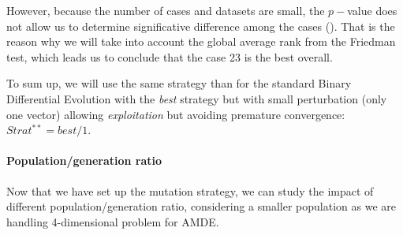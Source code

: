 \documentclass[12pt, openany]{article}
\begin{document}
However, because the number of cases and datasets are small, the $p-$value does not allow us to determine significative difference among the cases (). That is the reason why we will take into account the global average rank from the Friedman test, which leads us to conclude that the case 23 is the best overall.

\begin{table}[H]
    \centering
    \renewcommand{\arraystretch}{1.3}
    \caption{\textbf{Summary of statistical significance tests for the AMDE mutation strategies.} The Critical Difference (CD) sets the threshold for Nemenyi pairwise significance. No significant differences were detected ($p \ge 0.05$); the best strategy ($Strat^{**}=$ best/1, Case~23) is therefore selected on the lowest global average rank.}
    \label{tab:statistical_tests_AMDE_strategy}
\end{table}

To sum up, we will use the same strategy than for the standard Binary Differential Evolution with the \textit{best} strategy but with small perturbation (only one vector) allowing \emph{exploitation} but avoiding premature convergence: $\boxed{Strat^{**} = best/1}$.

\paragraph{Population/generation ratio} Now that we have set up the mutation strategy, we can study the impact of different population/generation ratio, considering a smaller population as we are handling 4-dimensional problem for AMDE.
\end{document}
